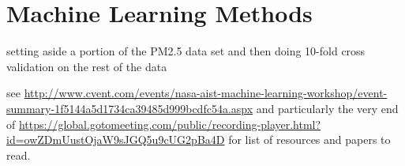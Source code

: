 \section{Machine Learning Methods}

setting aside a portion of the PM2.5 data set and then doing 10-fold cross validation on the rest of the data

see \url{http://www.cvent.com/events/nasa-aist-machine-learning-workshop/event-summary-1f5144a5d1734ca39485d999bcdfc54a.aspx} and particularly the very end of \url{https://global.gotomeeting.com/public/recording-player.html?id=owZDmUustOjaW9sJGQ5u9cUG2pBa4D} for list of resources and papers to read.